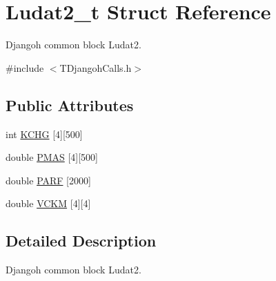 \hypertarget{struct_ludat2__t}{\section{Ludat2\+\_\+t Struct Reference}
\label{struct_ludat2__t}
}


Djangoh common block Ludat2.  




{\ttfamily \#include $<$T\+Djangoh\+Calls.\+h$>$}

\subsection*{Public Attributes}
\begin{DoxyCompactItemize}
\item 
int \hyperlink{struct_ludat2__t_ae7ac5c356f6954159345aa9043cde094}{K\+C\+H\+G} \mbox{[}4\mbox{]}\mbox{[}500\mbox{]}
\item 
double \hyperlink{struct_ludat2__t_a3ba40c50d21f9c3e2a9f27a1630e9199}{P\+M\+A\+S} \mbox{[}4\mbox{]}\mbox{[}500\mbox{]}
\item 
double \hyperlink{struct_ludat2__t_a1691485f7138c4707132de64991719e5}{P\+A\+R\+F} \mbox{[}2000\mbox{]}
\item 
double \hyperlink{struct_ludat2__t_a20d157be63ce36f91641642e81bb7334}{V\+C\+K\+M} \mbox{[}4\mbox{]}\mbox{[}4\mbox{]}
\end{DoxyCompactItemize}


\subsection{Detailed Description}
Djangoh common block Ludat2. 

